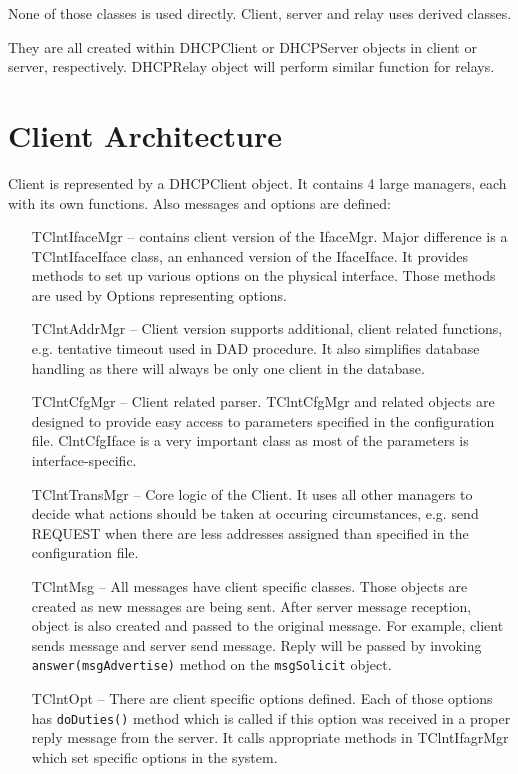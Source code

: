 None of those classes is used directly. Client, server and
relay uses derived classes.

They are all created within DHCPClient or DHCPServer objects in client
or server, respectively. DHCPRelay object will perform similar
function for relays.

\section{Client Architecture}

Client is represented by a DHCPClient object. It contains 4 large
managers, each with its own functions. Also messages and options are
defined:

\begin{itemize}
\item[TClntIfaceMgr] -- contains client version of the IfaceMgr. Major
  difference is a TClntIfaceIface class, an enhanced version of the
  IfaceIface. It provides methods to set up various options on the
  physical interface. Those methods are used by Options representing
  options.
\item[TClntAddrMgr] -- Client version supports additional, client
  related functions, e.g. tentative timeout used in DAD procedure. It
  also simplifies database handling as there will always be only one
  client in the database.
\item[TClntCfgMgr] -- Client related parser. TClntCfgMgr and related
  objects are designed to provide easy access to parameters specified
  in the configuration file. ClntCfgIface is a very important class as
  most of the parameters is interface-specific.
\item[TClntTransMgr] -- Core logic of the Client. It uses all other
  managers to decide what actions should be taken at occuring
  circumstances, e.g. send REQUEST when there are less addresses
  assigned than specified in the configuration file.
\item[TClntMsg] -- All messages have client specific
  classes. Those objects are created as new messages are being
  sent. After server message reception, object is also created and
  passed to the original message. For example, client sends
   message and server send  message. Reply
  will be passed by invoking \verb+answer(msgAdvertise)+ method on the
  \verb+msgSolicit+ object.
\item[TClntOpt] -- There are client specific options defined. Each
  of those options has \verb+doDuties()+ method which is called if this
  option was received in a proper reply message from the server. It
  calls appropriate methods in TClntIfagrMgr which set specific options
  in the system.
\end{itemize}

